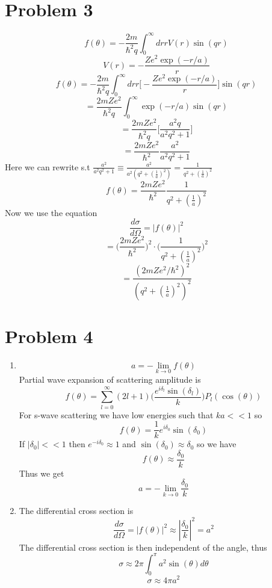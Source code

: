 \documentclass[12pt]{article}
\begin{document}
\section*{Problem 3}
$$ f(\theta) = - \frac{2m}{\hbar^2 q} \int_0^{\infty} dr r V(r) \sin(qr) $$
$$ V(r) = - \frac{Ze^2 \exp(-r/a)}{r} $$
$$ f(\theta) = - \frac{2m}{\hbar^2 q} \int_0^{\infty} dr r \Big[ - \frac{Ze^2 \exp(-r/a) }{r} \Big] \sin(qr) $$
$$ = \frac{2mZe^2}{\hbar^2 q} \int_0^{\infty} \exp(-r/a) \sin(qr) $$
$$ = \frac{2mZe^2}{\hbar^2 q} \Big[\frac{a^2 q}{a^2 q^2 +1} \Big] $$
$$ = \frac{2mZe^2}{\hbar^2} \frac{a^2}{a^2 q^2 +1 } $$
Here we can rewrite s.t $\frac{a^2}{a^2 q^2 +1 } \equiv \frac{a^2}{a^2 (q^2 + (\frac{1}{a} )^2)} = \frac{1}{q^2 + (\frac{1}{a} )^2} $
$$ f(\theta) = \frac{2mZe^2}{\hbar^2} \frac{1}{q^2 + (\frac{1}{a} )^2 } $$
Now we use the equation 
$$ \frac{d \sigma}{d \Omega} = | f (\theta) |^2 $$
$$ = \Big( \frac{2mZe^2}{\hbar^2} \Big)^2 \cdot \Big( \frac{1}{q^2 + (\frac{1}{a} )^2}\Big)^2 $$
$$ = \frac{(2mZe^2/ \hbar^2)^2}{(q^2 + (\frac{1}{a} )^2)^2} $$

\section*{Problem 4}
\begin{enumerate}
    \item $$ a = - \lim_{k \to 0} f(\theta) $$
    Partial wave expansion of scattering amplitude is 
    $$ f (\theta) = \sum_{l=0}^{\infty} (2l +1) \Big( \frac{e^{i \delta_l} \sin (\delta_l) }{k}\Big) P_l (\cos (\theta)) $$
    For s-wave scattering we have low energies such that $ka << 1$ so 
    $$ f(\theta) = \frac{1}{k} e^{i \delta_0} \sin(\delta_0) $$
    If $|\delta_0| < < 1$ then $e^{-i \delta_0} \approx 1$ and $\sin (\delta_0 ) \approx \delta_0 $ so we have 
    $$ f(\theta ) \approx \frac{\delta_0}{k} $$
    Thus we get 
    $$ a = - \lim_{k \to 0} \frac{\delta_0}{k} $$

    \item The differential cross section is 
    $$ \frac{d \sigma}{d \Omega} = | f(\theta)|^2 \approx | \frac{\delta_0}{k}|^2 = a^2 $$
    The differential cross section is then independent of the angle, thus 
    $$ \sigma \approx 2 \pi \int_0^{\pi} a^2 \sin(\theta) d \theta $$
    $$ \sigma \approx 4 \pi a^2 $$

\end{enumerate}
\end{document}
